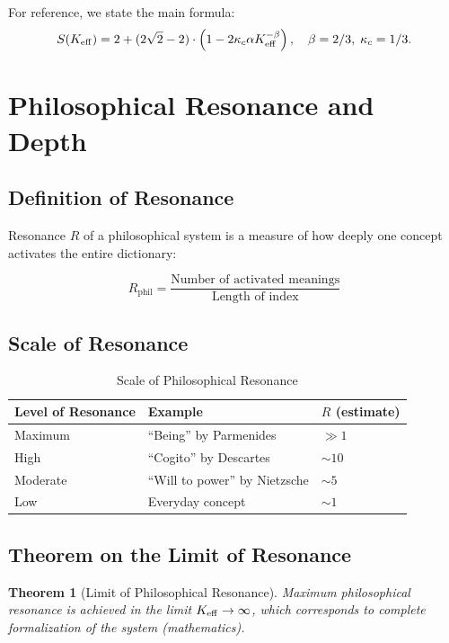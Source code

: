 \documentclass[12pt,a4paper]{article}
\newcommand{\kappac}{\kappa_c}
\newcommand{\betaf}{\beta}
\newtheorem{theorem}{Theorem}[section]
\begin{document}
	For reference, we state the main formula:
	\[
	S(\Keff) = 2 + (2\sqrt{2} - 2) \cdot \left(1 - 2\kappac \alpha \Keff^{-\betaf}\right), \quad \betaf=2/3,\; \kappac=1/3.
	\]
	
	\section{Philosophical Resonance and Depth}
	
	\subsection{Definition of Resonance}
	
	Resonance \(R\) of a philosophical system is a measure of how deeply one concept activates the entire dictionary:
	
	\begin{equation}
		R_{\text{phil}} = \frac{\text{Number of activated meanings}}{\text{Length of index}}
	\end{equation}
	
	\subsection{Scale of Resonance}
	
	\begin{table}[H]
		\centering
		\caption{Scale of Philosophical Resonance}
		\begin{tabular}{p{4cm}p{5cm}p{5cm}}
			\toprule
			\textbf{Level of Resonance} & \textbf{Example} & \textbf{\(R\) (estimate)} \\
			\midrule
			Maximum & ``Being'' by Parmenides & \(\gg 1\) \\
			High & ``Cogito'' by Descartes & \(\sim 10\) \\
			Moderate & ``Will to power'' by Nietzsche & \(\sim 5\) \\
			Low & Everyday concept & \(\sim 1\) \\
			\bottomrule
		\end{tabular}
	\end{table}
	
	\subsection{Theorem on the Limit of Resonance}
	
	\begin{theorem}[Limit of Philosophical Resonance]
		Maximum philosophical resonance is achieved in the limit \(\Keff \to \infty\), which corresponds to complete formalization of the system (mathematics).
	\end{theorem}
	
\end{document}
